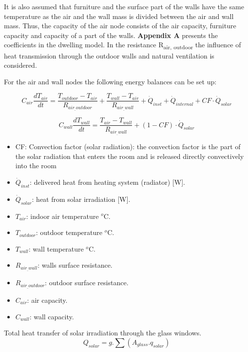  It is also assumed that furniture and the surface part of the walls have the same temperature as the air and the wall mass is divided between the air and wall mass. Thus, the capacity of the air node consists of the air capacity, furniture capacity and capacity of a part of the walls. \textbf{Appendix A} presents the coefficients in the dwelling model. In the resistance R\textsubscript{air, outdoor} the influence of heat transmission through the outdoor walls and natural ventilation is considered. 
 
For the air and wall nodes the following energy balances can be set up: 

\begin{equation}
C_{air}\frac{dT_{air}}{dt}=\frac{T_{outdoor}-T_{air}}{R_{air_{\_}outdoor}} + \frac{T_{wall}-T_{air}}{R_{air_{\_}wall}} + \dot{Q}_{inst} + \dot{Q}_{internal} + CF\cdot\dot{Q}_{solar}
\end{equation}

\begin{equation}
C_{wall}\frac{dT_{wall}}{dt}=\frac{T_{air}-T_{wall}}{R_{air_{\_}wall}} + (1-CF)\cdot\dot{Q}_{solar}
\end{equation}

 \begin{itemize}
      \item CF: Convection factor (solar radiation): the convection factor is the part of the solar radiation that enters the room and is released directly convectively into the room
      \item $\dot{Q}_{inst}$: delivered heat from heating system (radiator) [W].
      \item $\dot{Q}_{solar}$: heat from solar irradiation [W].
      \item $T_{air}$: indoor air temperature $^o$C.
      \item $T_{outdoor}$: outdoor temperature $^o$C.
      \item $T_{wall}$: wall temperature $^o$C.
      \item $R_{air_{\_}wall}$: walls surface resistance.
      \item $R_{air_{\_}outdoor}$: outdoor surface resistance.
      \item $C_{air}$: air capacity.
      \item $C_{wall}$: wall capacity.
    \end{itemize}
    

Total heat transfer of solar irradiation through the glass windows. 
\begin{equation}
Q_{solar}=g.\sum(A_{glass}.q_{solar})
\end{equation}

